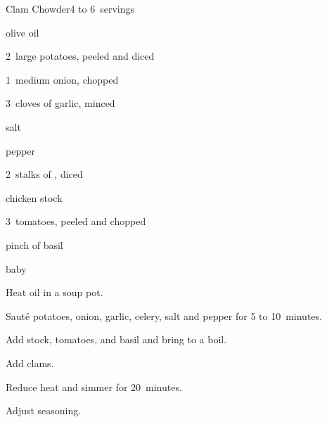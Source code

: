 \begin{recipe}{Clam Chowder}{}{4 to 6~servings}

\begin{ingredients}
\item {} olive oil
\item 2~large potatoes, peeled and diced
\item 1~medium onion, chopped
\item 3~cloves of garlic, minced
\item salt
\item pepper
\item 2~stalks of , diced
\item {} chicken stock
\item 3~tomatoes, peeled and chopped
\item pinch of basil
\item {} baby 
\end{ingredients}

\begin{directions}
\item Heat oil in a soup pot.
\item Saut\'e potatoes, onion, garlic, celery, salt and pepper for 5 to 10~minutes.
\item Add stock, tomatoes, and basil and bring to a boil.
\item Add clams.
\item Reduce heat and simmer for 20~minutes.
\item Adjust seasoning.
\end{directions}

\end{recipe}
